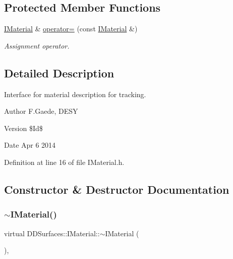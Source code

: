 \subsection*{Protected Member Functions}
\begin{DoxyCompactItemize}
\item 
\hyperlink{class_d_d_surfaces_1_1_i_material}{I\+Material} \& \hyperlink{class_d_d_surfaces_1_1_i_material_ad50224941bead73447e93594edaaad04}{operator=} (const \hyperlink{class_d_d_surfaces_1_1_i_material}{I\+Material} \&)
\begin{DoxyCompactList}\small\item\em Assignment operator. \end{DoxyCompactList}\end{DoxyCompactItemize}


\subsection{Detailed Description}
Interface for material description for tracking.

\begin{DoxyAuthor}{Author}
F.\+Gaede, D\+E\+SY 
\end{DoxyAuthor}
\begin{DoxyVersion}{Version}
\$\+Id\$ 
\end{DoxyVersion}
\begin{DoxyDate}{Date}
Apr 6 2014 
\end{DoxyDate}


Definition at line 16 of file I\+Material.\+h.



\subsection{Constructor \& Destructor Documentation}
\hypertarget{class_d_d_surfaces_1_1_i_material_ac285cbca4d2083eefe1265970e671583}{}\label{class_d_d_surfaces_1_1_i_material_ac285cbca4d2083eefe1265970e671583} 
\subsubsection{\texorpdfstring{$\sim$\+I\+Material()}{~IMaterial()}}
{\footnotesize\ttfamily virtual D\+D\+Surfaces\+::\+I\+Material\+::$\sim$\+I\+Material (\begin{DoxyParamCaption}{ }\end{DoxyParamCaption})\hspace{0.3cm}{\ttfamily [inline]}, {\ttfamily [virtual]}}



